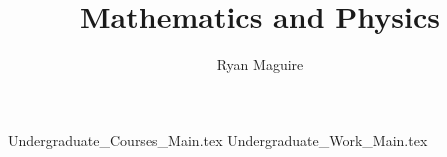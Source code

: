 \documentclass[oneside]{book}
\title{Mathematics and Physics}
\author{Ryan Maguire}
\date{\vspace{-5ex}}
\begin{document}
\maketitle
\tableofcontents
\listoffigures
\listoftables
\clearpage
{}
{Undergraduate_Courses_Main.tex}
{Undergraduate_Work_Main.tex}
\clearpage
\printglossary[type=\acronymtype]
\clearpage
\printglossary[style=long]
\clearpage

\end{document}
